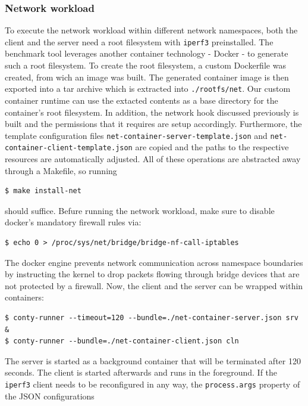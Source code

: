 \subsubsection{Network workload}
To execute the network workload within different network namespaces, both the client and the server 
need a root filesystem with \verb|iperf3| preinstalled. The benchmark tool leverages another 
container technology - Docker - to generate such a root filesystem. 
To create the root filesystem, a custom Dockerfile was created, from wich an image was built. The generated container 
image is then exported into a tar archive which is extracted into \verb|./rootfs/net|. Our custom container runtime 
can use the extacted contents as a base directory for the container's root filesystem.
In addition, the network hook discussed previously is built and the permissions that it requires 
are setup accordingly. Furthermore, the template configuration files \verb|net-container-server-template.json|
and \verb|net-container-client-template.json| are copied and the paths to the respective resources 
are automatically adjusted. All of these operations are abstracted away through a Makefile, so running 
\begin{lstlisting}[label={code:implementation/benchmark/network-install}, style=bash, caption={}]
$ make install-net
\end{lstlisting}
should suffice.
Befure running the network workload, make sure to disable docker's mandatory firewall rules 
via:
\begin{lstlisting}[label={code:implementation/benchmark/network-firewall}, style=bash, caption={}]
$ echo 0 > /proc/sys/net/bridge/bridge-nf-call-iptables
\end{lstlisting}
The docker engine prevents network communication across namespace boundaries by instructing 
the kernel to drop packets flowing through bridge devices that are not protected by a firewall.
Now, the client and the server can be wrapped within containers:
\begin{lstlisting}[label={code:implementation/benchmark/network-run}, style=bash, caption={}]
$ conty-runner --timeout=120 --bundle=./net-container-server.json srv &
$ conty-runner --bundle=./net-container-client.json cln
\end{lstlisting}
The server is started as a background container that will be terminated after 120 seconds.
The client is started afterwards and runs in the foreground. If the \verb|iperf3| client 
needs to be reconfigured in any way, the \verb|process.args| property of the JSON configurations 
